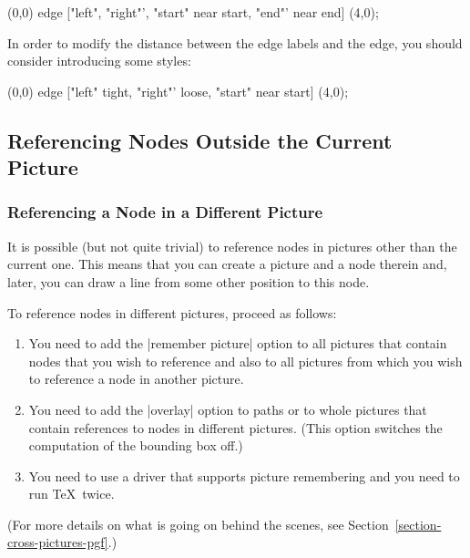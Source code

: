 \begin{codeexample}[]
\tikz 
  \draw (0,0) edge ["left", "right"',
                    "start" near start,
                    "end"' near end] (4,0);
\end{codeexample}

In order to modify the distance between the edge labels and the edge,
you should consider introducing some styles:

\begin{codeexample}[]
\tikz [tight/.style={inner sep=1pt}, loose/.style={inner sep=.7em}]
  \draw (0,0) edge ["left"   tight,
                    "right"' loose,
                    "start"  near start] (4,0);
\end{codeexample}


\subsection{Referencing Nodes Outside the Current Picture}

\label{section-cross-picture-tikz}

\subsubsection{Referencing a Node in a Different Picture}

It is possible (but not quite trivial) to reference nodes in pictures
other than the current one. This means that you can create a picture
and a node therein and, later, you can draw a line from some other
position to this node.

To reference nodes in different pictures, proceed as follows:
\begin{enumerate}
\item You need to add the |remember picture| option to all pictures
  that contain nodes that you wish to reference and also to all
  pictures from which you wish to reference a node in another
  picture.
\item You need to add the |overlay| option to paths or to whole
  pictures that contain references to nodes in different
  pictures. (This option switches the computation of the
  bounding box off.)
\item You need to use a driver that supports picture remembering and
  you need to run \TeX\ twice.
\end{enumerate}
(For more details on what is going on behind the scenes, see
Section~\ref{section-cross-pictures-pgf}.)

